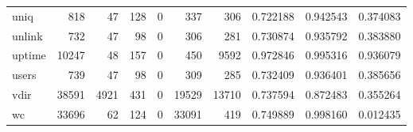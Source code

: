 \begin{longtable}{lrrrrrrrrr}
uniq      &                                                818 &                                                 47 &                                                128 &                                                  0 &                                                337 &                                                306 &                                           0.722188 &                               0.942543 &                             0.374083 \\
unlink    &                                                732 &                                                 47 &                                                 98 &                                                  0 &                                                306 &                                                281 &                                           0.730874 &                               0.935792 &                             0.383880 \\
uptime    &                                              10247 &                                                 48 &                                                157 &                                                  0 &                                                450 &                                               9592 &                                           0.972846 &                               0.995316 &                             0.936079 \\
users     &                                                739 &                                                 47 &                                                 98 &                                                  0 &                                                309 &                                                285 &                                           0.732409 &                               0.936401 &                             0.385656 \\
vdir      &                                              38591 &                                               4921 &                                                431 &                                                  0 &                                              19529 &                                              13710 &                                           0.737594 &                               0.872483 &                             0.355264 \\
wc        &                                              33696 &                                                 62 &                                                124 &                                                  0 &                                              33091 &                                                419 &                                           0.749889 &                               0.998160 &                             0.012435 \\

\end{longtable}
